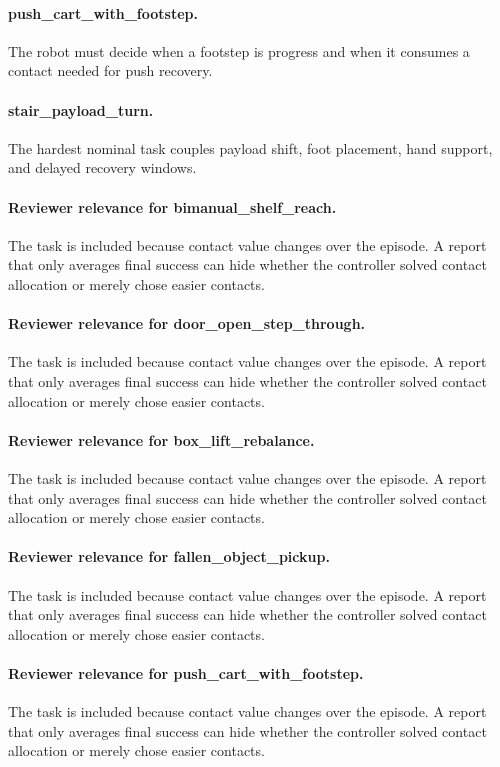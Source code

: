 \documentclass{article}
\begin{document}
\paragraph{push\_cart\_with\_footstep.} The robot must decide when a footstep is progress and when it consumes a contact needed for push recovery.
\paragraph{stair\_payload\_turn.} The hardest nominal task couples payload shift, foot placement, hand support, and delayed recovery windows.
\paragraph{Reviewer relevance for bimanual\_shelf\_reach.} The task is included because contact value changes over the episode. A report that only averages final success can hide whether the controller solved contact allocation or merely chose easier contacts.
\paragraph{Reviewer relevance for door\_open\_step\_through.} The task is included because contact value changes over the episode. A report that only averages final success can hide whether the controller solved contact allocation or merely chose easier contacts.
\paragraph{Reviewer relevance for box\_lift\_rebalance.} The task is included because contact value changes over the episode. A report that only averages final success can hide whether the controller solved contact allocation or merely chose easier contacts.
\paragraph{Reviewer relevance for fallen\_object\_pickup.} The task is included because contact value changes over the episode. A report that only averages final success can hide whether the controller solved contact allocation or merely chose easier contacts.
\paragraph{Reviewer relevance for push\_cart\_with\_footstep.} The task is included because contact value changes over the episode. A report that only averages final success can hide whether the controller solved contact allocation or merely chose easier contacts.
\end{document}
